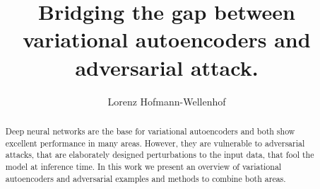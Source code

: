 \documentclass[sigconf]{acmart}
\begin{document}
\title{Bridging the gap between variational autoencoders and adversarial attack.}

\author{Lorenz Hofmann-Wellenhof}

\begin{abstract}
  Deep neural networks are the base for variational autoencoders and both show
  excellent performance in many areas. However, they are vulnerable to
  adversarial attacks, that are elaborately designed perturbations to the input
  data, that fool the model at inference time. In this work we present an
  overview of variational autoencoders and adversarial examples and methods to
  combine both areas.
\end{abstract}



\maketitle










 




\end{document}
